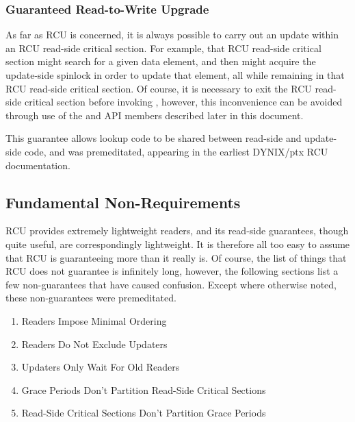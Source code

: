 \subsubsection{Guaranteed Read-to-Write Upgrade}

As far as RCU is concerned, it is always possible to carry out an update
within an RCU read-side critical section. For example, that RCU
read-side critical section might search for a given data element, and
then might acquire the update-side spinlock in order to update that
element, all while remaining in that RCU read-side critical section. Of
course, it is necessary to exit the RCU read-side critical section
before invoking , however, this inconvenience can
be avoided through use of the  and  API
members described later in this document.

\QuickQuizEnd

This guarantee allows lookup code to be shared between read-side and
update-side code, and was premeditated, appearing in the earliest
DYNIX/ptx RCU documentation.


\subsection{Fundamental Non-Requirements}

RCU provides extremely lightweight readers, and its read-side
guarantees, though quite useful, are correspondingly lightweight.
It is
therefore all too easy to assume that RCU is guaranteeing more than it
really is.
Of course, the list of things that RCU does not guarantee is
infinitely long, however, the following sections list a few
non-guarantees that have caused confusion.
Except where otherwise noted,
these non-guarantees were premeditated.

\begin{enumerate}
\item Readers Impose Minimal Ordering
\item Readers Do Not Exclude Updaters
\item Updaters Only Wait For Old Readers
\item Grace Periods Don't Partition Read-Side Critical Sections
\item Read-Side Critical Sections Don't Partition Grace Periods
\end{enumerate}


